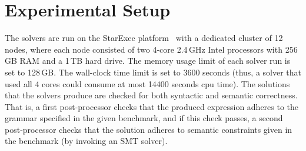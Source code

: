 \section{Experimental Setup} 
\label{sec:exp-set}

The solvers are run on the StarExec platform~\cite{starexec} with a dedicated cluster of 12 nodes,
where each node consisted of two 4-core 2.4\,GHz Intel processors with 256\,GB RAM and a 1\,TB hard drive.
The memory usage limit of each solver run is set to 128\,GB.
The wall-clock time limit is set to 3600 seconds (thus, a solver that used all 4 cores could consume at most 14400 seconds cpu time).
The solutions that the solvers produce are checked for both syntactic and semantic correctness.
That is, a first post-processor checks that the produced expression adheres to the grammar specified in the given benchmark,
and if this check passes, a second post-processor checks that the solution adheres to semantic constraints
given in the benchmark (by invoking an SMT solver).